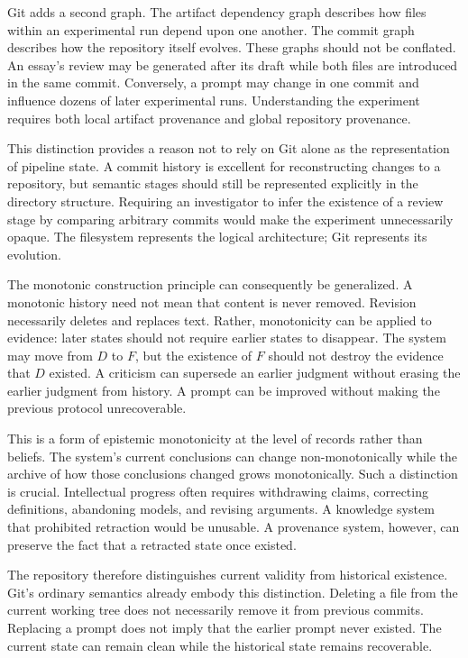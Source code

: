 \documentclass[11pt]{article}
\begin{document}
Git adds a second graph. The artifact dependency graph describes how files within an experimental run depend upon one another. The commit graph describes how the repository itself evolves. These graphs should not be conflated. An essay's review may be generated after its draft while both files are introduced in the same commit. Conversely, a prompt may change in one commit and influence dozens of later experimental runs. Understanding the experiment requires both local artifact provenance and global repository provenance.

This distinction provides a reason not to rely on Git alone as the representation of pipeline state. A commit history is excellent for reconstructing changes to a repository, but semantic stages should still be represented explicitly in the directory structure. Requiring an investigator to infer the existence of a review stage by comparing arbitrary commits would make the experiment unnecessarily opaque. The filesystem represents the logical architecture; Git represents its evolution.

The monotonic construction principle can consequently be generalized. A monotonic history need not mean that content is never removed. Revision necessarily deletes and replaces text. Rather, monotonicity can be applied to evidence: later states should not require earlier states to disappear. The system may move from \(D\) to \(F\), but the existence of \(F\) should not destroy the evidence that \(D\) existed. A criticism can supersede an earlier judgment without erasing the earlier judgment from history. A prompt can be improved without making the previous protocol unrecoverable.

This is a form of epistemic monotonicity at the level of records rather than beliefs. The system's current conclusions can change non-monotonically while the archive of how those conclusions changed grows monotonically. Such a distinction is crucial. Intellectual progress often requires withdrawing claims, correcting definitions, abandoning models, and revising arguments. A knowledge system that prohibited retraction would be unusable. A provenance system, however, can preserve the fact that a retracted state once existed.

The repository therefore distinguishes current validity from historical existence. Git's ordinary semantics already embody this distinction. Deleting a file from the current working tree does not necessarily remove it from previous commits. Replacing a prompt does not imply that the earlier prompt never existed. The current state can remain clean while the historical state remains recoverable.
\end{document}
